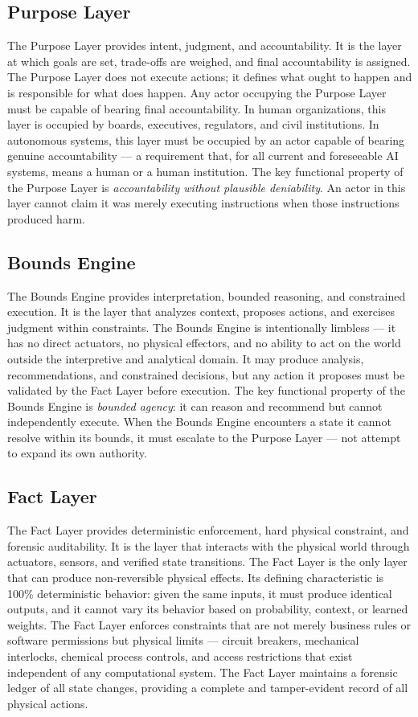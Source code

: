 \documentclass[11pt, a4paper]{article}
\begin{document}
\subsection{Purpose Layer}
The Purpose Layer provides intent, judgment, and accountability. It is the layer at which goals are set, trade-offs are weighed, and final accountability is assigned. The Purpose Layer does not execute actions; it defines what ought to happen and is responsible for what does happen. Any actor occupying the Purpose Layer must be capable of bearing final accountability. In human organizations, this layer is occupied by boards, executives, regulators, and civil institutions. In autonomous systems, this layer must be occupied by an actor capable of bearing genuine accountability --- a requirement that, for all current and foreseeable AI systems, means a human or a human institution. The key functional property of the Purpose Layer is \textit{accountability without plausible deniability}. An actor in this layer cannot claim it was merely executing instructions when those instructions produced harm.
\subsection{Bounds Engine}
The Bounds Engine provides interpretation, bounded reasoning, and constrained execution. It is the layer that analyzes context, proposes actions, and exercises judgment within constraints. The Bounds Engine is intentionally limbless --- it has no direct actuators, no physical effectors, and no ability to act on the world outside the interpretive and analytical domain. It may produce analysis, recommendations, and constrained decisions, but any action it proposes must be validated by the Fact Layer before execution. The key functional property of the Bounds Engine is \textit{bounded agency}: it can reason and recommend but cannot independently execute. When the Bounds Engine encounters a state it cannot resolve within its bounds, it must escalate to the Purpose Layer --- not attempt to expand its own authority.
\subsection{Fact Layer}
The Fact Layer provides deterministic enforcement, hard physical constraint, and forensic auditability. It is the layer that interacts with the physical world through actuators, sensors, and verified state transitions. The Fact Layer is the only layer that can produce non-reversible physical effects. Its defining characteristic is 100\% deterministic behavior: given the same inputs, it must produce identical outputs, and it cannot vary its behavior based on probability, context, or learned weights. The Fact Layer enforces constraints that are not merely business rules or software permissions but physical limits --- circuit breakers, mechanical interlocks, chemical process controls, and access restrictions that exist independent of any computational system. The Fact Layer maintains a forensic ledger of all state changes, providing a complete and tamper-evident record of all physical actions.
\end{document}
